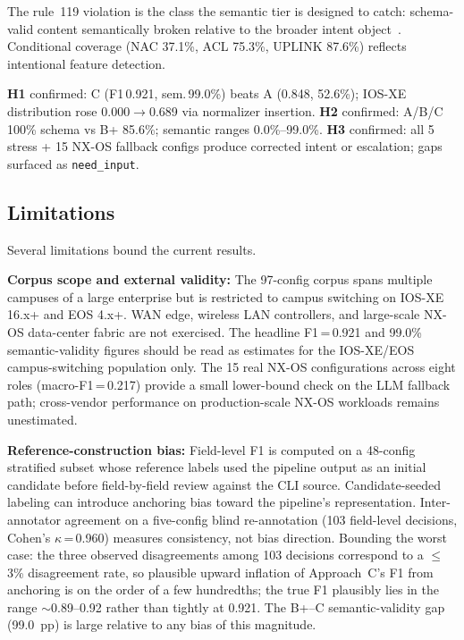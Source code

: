 \documentclass[conference]{IEEEtran}
\begin{document}
The rule~119 violation is the class the semantic tier is designed to catch: schema-valid content semantically broken relative to the broader intent object~\cite{fogel2015batfish,beckett2017minesweeper}. Conditional coverage (NAC 37.1\%, ACL 75.3\%, UPLINK 87.6\%) reflects intentional feature detection.

\textbf{H1} confirmed: C (F1\,0.921, sem.\,99.0\%) beats A (0.848, 52.6\%); IOS-XE distribution rose 0.000$\to$0.689 via normalizer insertion. \textbf{H2} confirmed: A/B/C 100\% schema vs B+ 85.6\%; semantic ranges 0.0\%--99.0\%. \textbf{H3} confirmed: all 5 stress + 15 NX-OS fallback configs produce corrected intent or escalation; gaps surfaced as \texttt{need\_input}.

\subsection{Limitations}

Several limitations bound the current results.

\textbf{Corpus scope and external validity:} The 97-config corpus spans multiple campuses of a large enterprise but is restricted to campus switching on IOS-XE 16.x+ and EOS 4.x+. WAN edge, wireless LAN controllers, and large-scale NX-OS data-center fabric are not exercised. The headline F1\,=\,0.921 and 99.0\% semantic-validity figures should be read as estimates for the IOS-XE/EOS campus-switching population only. The 15 real NX-OS configurations across eight roles (macro-F1\,=\,0.217) provide a small lower-bound check on the LLM fallback path; cross-vendor performance on production-scale NX-OS workloads remains unestimated.

\textbf{Reference-construction bias:} Field-level F1 is computed on a 48-config stratified subset whose reference labels used the pipeline output as an initial candidate before field-by-field review against the CLI source. Candidate-seeded labeling can introduce anchoring bias toward the pipeline's representation. Inter-annotator agreement on a five-config blind re-annotation (103 field-level decisions, Cohen's $\kappa$\,=\,0.960) measures consistency, not bias direction. Bounding the worst case: the three observed disagreements among 103 decisions correspond to a $\leq$3\% disagreement rate, so plausible upward inflation of Approach~C's F1 from anchoring is on the order of a few hundredths; the true F1 plausibly lies in the range $\sim$0.89--0.92 rather than tightly at 0.921. The B+--C semantic-validity gap (99.0~pp) is large relative to any bias of this magnitude.
\end{document}
